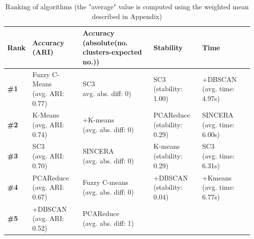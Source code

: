 \documentclass{report}
\begin{document}
\begin{table}[H]
\centering
\caption{Ranking of algorithms (the "average" value is computed using the weighted mean described in Appendix)}
\begin{tabular}{| l | l | l | l | l |}
\hline
\parbox[c]{2cm}{\textbf{Rank}} & 
\parbox[c]{3cm}{\textbf{Accuracy\\(ARI)}} & 
\parbox[c]{3cm}{\textbf{Accuracy\\(absolute(no.\\clusters-expected no.))\\}} & 
\parbox[c]{3cm}{\textbf{Stability}} &
\parbox[c]{3cm}{\textbf{Time}}\\
\hline
\parbox[c]{2cm}{\textbf{\#1}} & 
\parbox[c]{3cm}{Fuzzy C-Means\\(avg. ARI: 0.77)} & 
\parbox[c]{3cm}{SC3\\avg. abs. diff: 0)} & 
\parbox[c]{3cm}{SC3\\(stability: 1.00)} &
\parbox[c]{3cm}{+DBSCAN\\(avg. time: 4.97s)}\\
\hline
\parbox[c]{2cm}{\textbf{\#2}} & 
\parbox[c]{3cm}{K-Means\\(avg. ARI: 0.74)} & 
\parbox[c]{3cm}{+K-means\\(avg. abs. diff: 0)} & 
\parbox[c]{3cm}{PCAReduce\\(stability: 0.29)} &
\parbox[c]{3cm}{SINCERA\\(avg. time: 6.00s)}\\
\hline
\parbox[c]{2cm}{\textbf{\#3}} & 
\parbox[c]{3cm}{SC3\\(avg. ARI: 0.70)} & 
\parbox[c]{3cm}{SINCERA\\(avg. abs. diff: 0)} & 
\parbox[c]{3cm}{K-means\\(stability: 0.29)} &
\parbox[c]{3cm}{SC3\\(avg. time: 6.31s)}\\
\hline
\parbox[c]{2cm}{\textbf{\#4}} & 
\parbox[c]{3cm}{PCAReduce\\(avg. ARI: 0.67)} & 
\parbox[c]{3cm}{Fuzzy C-means\\(avg. abs. diff: 0)} & 
\parbox[c]{3cm}{+DBSCAN\\(stability: 0.04)} &
\parbox[c]{3cm}{+Kmeans\\(avg. time: 6.77s)}\\
\hline
\parbox[c]{2cm}{\textbf{\#5}} & 
\parbox[c]{3cm}{+DBSCAN\\(avg. ARI: 0.52)} & 
\parbox[c]{3cm}{PCAReduce\\(avg. abs. diff: 1)} & 

\end{tabular}
\end{table}
\end{document}
